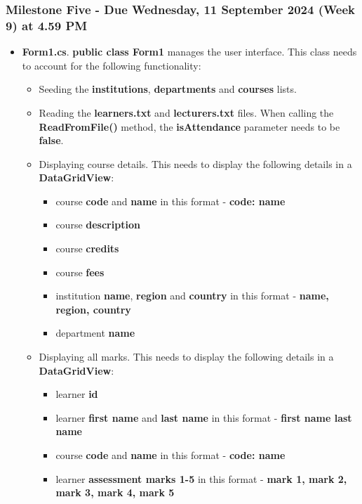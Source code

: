 \documentclass{article}
\begin{document}
\subsubsection*{Milestone Five - Due Wednesday, 11 September 2024 (Week 9) at 4.59 PM}

\begin{itemize}
    \item \textbf{Form1.cs}. \textbf{public class Form1} manages the user interface. This class needs to account for the following functionality:
    \begin{itemize}
        \item Seeding the \textbf{institutions}, \textbf{departments} and \textbf{courses} lists.
        \item Reading the \textbf{learners.txt} and \textbf{lecturers.txt} files. When calling the \textbf{ReadFromFile()} method, the \textbf{isAttendance} parameter needs to be \textbf{false}.
        \item Displaying course details. This needs to display the following details in a \textbf{DataGridView}:
        \begin{itemize}
            \item course \textbf{code} and \textbf{name} in this format - \textbf{code: name}
            \item course \textbf{description}
            \item course \textbf{credits}
            \item course \textbf{fees}
            \item institution \textbf{name}, \textbf{region} and \textbf{country} in this format - \textbf{name, region, country}
            \item department \textbf{name}
        \end{itemize}
        \item Displaying all marks. This needs to display the following details in a \textbf{DataGridView}:
        \begin{itemize}
            \item learner \textbf{id}
            \item learner \textbf{first name} and \textbf{last name} in this format - \textbf{first name last name}
            \item course \textbf{code} and \textbf{name} in this format - \textbf{code: name}
            \item learner \textbf{assessment marks 1-5} in this format - \textbf{mark 1, mark 2, mark 3, mark 4, mark 5}

\end{itemize}
\end{itemize}
\end{itemize}
\end{document}
